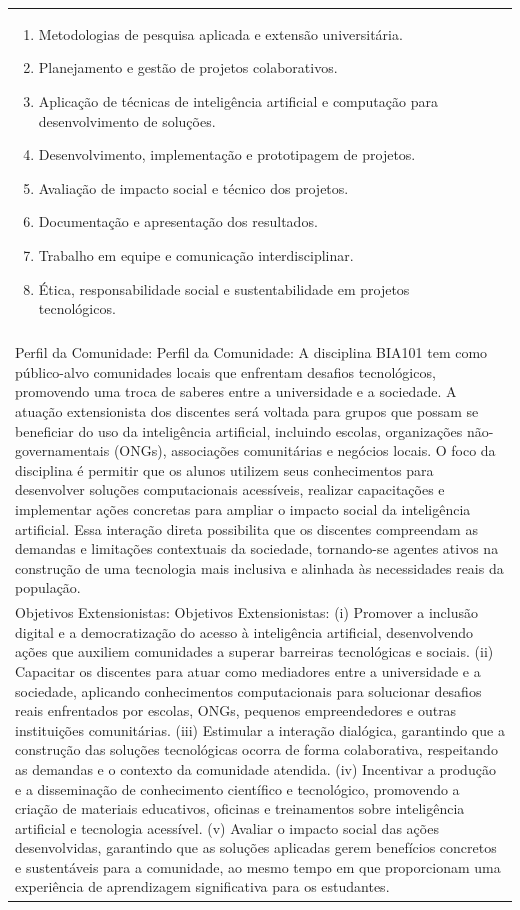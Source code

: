 \documentclass[11pt]{article}
\begin{document}
\begin{center}
\begin{longtable}{|p{4cm}|p{4cm}|p{4cm}|p{4cm}|}
{\begin{enumerate}
\item Metodologias de pesquisa aplicada e extensão universitária.
\item Planejamento e gestão de projetos colaborativos.
\item Aplicação de técnicas de inteligência artificial e computação para desenvolvimento de soluções.
\item Desenvolvimento, implementação e prototipagem de projetos.
\item Avaliação de impacto social e técnico dos projetos.
\item Documentação e apresentação dos resultados.
\item Trabalho em equipe e comunicação interdisciplinar.
\item Ética, responsabilidade social e sustentabilidade em projetos tecnológicos.\end{enumerate}}\\
\multicolumn{4}{|p{16cm}|}{}\\
\multicolumn{4}{|p{16cm}|}{Perfil da Comunidade: Perfil da Comunidade: A disciplina BIA101 tem como público-alvo comunidades locais que enfrentam desafios tecnológicos, promovendo uma troca de saberes entre a universidade e a sociedade. A atuação extensionista dos discentes será voltada para grupos que possam se beneficiar do uso da inteligência artificial, incluindo escolas, organizações não-governamentais (ONGs), associações comunitárias e negócios locais. O foco da disciplina é permitir que os alunos utilizem seus conhecimentos para desenvolver soluções computacionais acessíveis, realizar capacitações e implementar ações concretas para ampliar o impacto social da inteligência artificial. Essa interação direta possibilita que os discentes compreendam as demandas e limitações contextuais da sociedade, tornando-se agentes ativos na construção de uma tecnologia mais inclusiva e alinhada às necessidades reais da população.}\\
\multicolumn{4}{|p{16cm}|}{Objetivos Extensionistas: Objetivos Extensionistas: (i) Promover a inclusão digital e a democratização do acesso à inteligência artificial, desenvolvendo ações que auxiliem comunidades a superar barreiras tecnológicas e sociais. (ii) Capacitar os discentes para atuar como mediadores entre a universidade e a sociedade, aplicando conhecimentos computacionais para solucionar desafios reais enfrentados por escolas, ONGs, pequenos empreendedores e outras instituições comunitárias. (iii) Estimular a interação dialógica, garantindo que a construção das soluções tecnológicas ocorra de forma colaborativa, respeitando as demandas e o contexto da comunidade atendida. (iv) Incentivar a produção e a disseminação de conhecimento científico e tecnológico, promovendo a criação de materiais educativos, oficinas e treinamentos sobre inteligência artificial e tecnologia acessível. (v) Avaliar o impacto social das ações desenvolvidas, garantindo que as soluções aplicadas gerem benefícios concretos e sustentáveis para a comunidade, ao mesmo tempo em que proporcionam uma experiência de aprendizagem significativa para os estudantes.}\\

\end{longtable}
\end{center}
\end{document}
